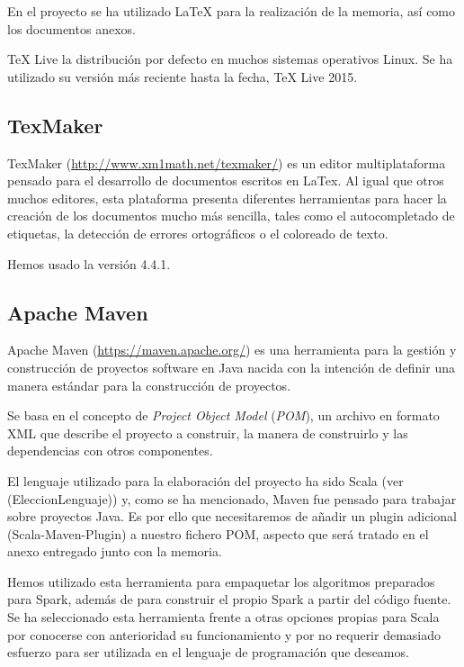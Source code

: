 En el proyecto se ha utilizado LaTeX para la realización de la memoria, así como los documentos anexos.

TeX Live la distribución por defecto en muchos sistemas operativos Linux. Se ha utilizado su versión más reciente hasta la fecha, TeX Live 2015.

\subsection{TexMaker}

TexMaker (\url{http://www.xm1math.net/texmaker/}) es un editor multiplataforma pensado para el desarrollo de documentos escritos en LaTex. Al igual que otros muchos editores, esta plataforma presenta diferentes herramientas para hacer la creación de los documentos mucho más sencilla, tales como el autocompletado de etiquetas, la detección de errores ortográficos o el coloreado de texto.

Hemos usado la versión 4.4.1.

\subsection{Apache Maven}

Apache Maven (\url{https://maven.apache.org/}) es una herramienta para la gestión y construcción de proyectos software en Java nacida con la intención de definir una manera estándar para la construcción de proyectos.

Se basa en el concepto de \textit{Project Object Model} (\textit{POM}), un archivo en formato XML que describe el proyecto a construir, la manera de construirlo y  las dependencias con otros componentes.

El lenguaje utilizado para la elaboración del proyecto ha sido Scala (ver \nameref(EleccionLenguaje)) y, como se ha mencionado, Maven fue pensado para trabajar sobre proyectos Java. Es por ello que necesitaremos de añadir un plugin adicional (Scala-Maven-Plugin) a nuestro fichero POM, aspecto que será tratado en el anexo entregado junto con la memoria.

Hemos utilizado esta herramienta para empaquetar los algoritmos preparados para Spark, además de para construir el propio Spark a partir del código fuente. Se ha seleccionado esta herramienta frente a otras opciones propias para Scala por conocerse con anterioridad su funcionamiento y por no requerir demasiado esfuerzo para ser utilizada en el lenguaje de programación que deseamos.